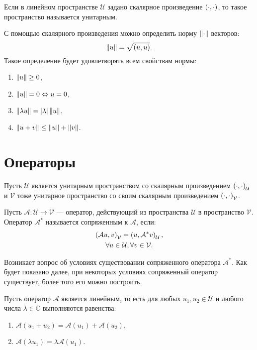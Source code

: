 Если в линейном пространстве $\mathcal{U}$ задано скалярное произведение $\left ( \cdot, \cdot \right )$, то такое пространство называется унитарным.

С помощью скалярного произведения можно определить норму $\left \| \cdot \right \|$ векторов:
\[
    \left \| u \right \| = \sqrt{\left ( u, u \right )}.
\]
Такое определение будет удовлетворять всем свойствам нормы:
\begin{enumerate}
    \item $\left \| u \right \| \ge 0$,
    \item $\left \| u \right \| = 0 \Leftrightarrow u = 0$,
    \item $\left \| \lambda u \right \| = \left | \lambda \right | \left \| u \right \|$,
    \item $\left \| u + v \right \| \le \left \| u \right \| + \left \| v \right \|$.
\end{enumerate}


\section{Операторы}

Пусть $\mathcal{U}$ является унитарным пространством со скалярным произведением $\left ( \cdot, \cdot \right )_\mathcal{U}$ и $\mathcal{V}$ тоже унитарное пространство
со своим скалярным произведением $\left ( \cdot, \cdot \right )_\mathcal{V}$.

Пусть $\mathcal{A} : \mathcal{U} \rightarrow \mathcal{V}$ --- оператор, действующий из пространства $\mathcal{U}$ в пространство $\mathcal{V}$.
Оператор $\mathcal{A}^*$ называется сопряженным к $\mathcal{A}$, если:
\begin{gather}
    \left ( \mathcal{A} u, v \right )_{\mathcal{V}} = \left ( u, \mathcal{A}^* v \right )_{\mathcal{U}}
    \label{rayleigh:operator:scalars_equality}, \\
    \forall u \in \mathcal{U}, \forall v \in \mathcal{V}
    \notag.
\end{gather}

Возникает вопрос об условиях существовании сопряженного оператора $\mathcal{A}^*$. Как будет показано далее, при некоторых условиях сопряженный оператор существует,
более того его можно построить.

Пусть оператор $\mathcal{A}$ является линейным, то есть для любых $u_1, u_2 \in \mathcal{U}$ и любого числа $\lambda \in \mathbb{C}$ выполняются равенства:
\begin{enumerate}
    \item $\mathcal{A}(u_1 + u_2) = \mathcal{A}(u_1) + \mathcal{A}(u_2)$,
    \item $\mathcal{A}(\lambda u_1) = \lambda \mathcal{A}(u_1)$.
\end{enumerate}

